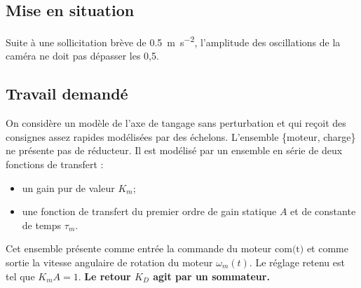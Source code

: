 \documentclass[10pt,fleqn]{article} %
\begin{document}
\def\pathfig{images}

\vspace{5cm}
\pagestyle{fancy}
\thispagestyle{plain}

\def\columnseprulecolor{\color{ocre}}
\setlength{\columnseprule}{0.4pt} 

\def\pathfig{images}

\ifprof
\else
\begin{multicols}{2}
\fi

\subsection*{Mise en situation}

\begin{obj}
Suite à une sollicitation brève de \SI{0,5}{m.s^{-2}}, l'amplitude des oscillations de la caméra ne doit pas dépasser les 0,5\degres.
\end{obj}

\subsection*{Travail demandé}

On considère un modèle de l’axe de tangage sans perturbation et qui reçoit des consignes assez rapides modélisées par
des échelons.
L’ensemble \{moteur, charge\} ne présente pas de réducteur. Il est modélisé par un ensemble en série de deux fonctions
de transfert :
\begin{itemize}
\item un gain pur de valeur $K_m$;%
\item une fonction de transfert du premier ordre de gain statique $A$ et de constante de temps $\tau_m$.
\end{itemize}
Cet ensemble présente comme entrée la commande du moteur $\text{com(t)}$ et comme sortie la vitesse angulaire de rotation
du moteur $\omega_m(t)$. Le réglage retenu est tel que $K_m A = 1$. \textbf{Le retour $K_D$ agit par un sommateur.}


\end{multicols}
\end{document}
